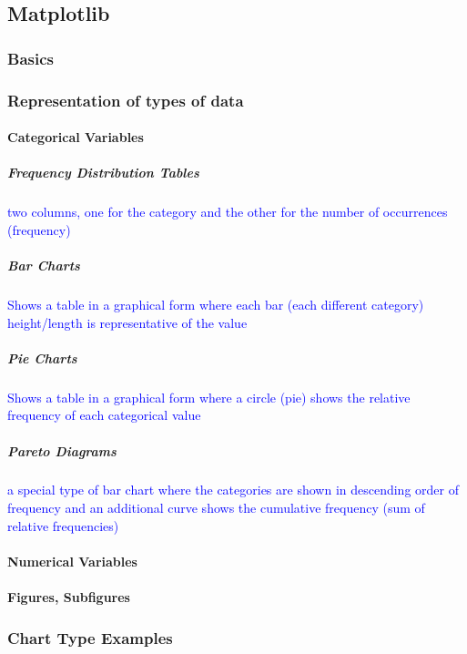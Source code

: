 \subsection{Matplotlib}

\subsubsection{Basics}

\subsubsection{Representation of types of data}

\paragraph{Categorical Variables}

\subparagraph{Frequency Distribution Tables}

\textcolor{blue}{two columns, one for the category and the other for the number of occurrences (frequency)}

\subparagraph{Bar Charts}

\textcolor{blue}{Shows a table in a graphical form where each bar (each different category) height/length is representative of the value}

\subparagraph{Pie Charts}

\textcolor{blue}{Shows a table in a graphical form where a circle (pie) shows the relative frequency of each categorical value}

\subparagraph{Pareto Diagrams}

\textcolor{blue}{a special type of bar chart where the categories are shown in descending order of frequency and an additional curve shows the cumulative frequency (sum of relative frequencies)}


\paragraph{Numerical Variables}



\paragraph{Figures, Subfigures}

\subsubsection{Chart Type Examples}

